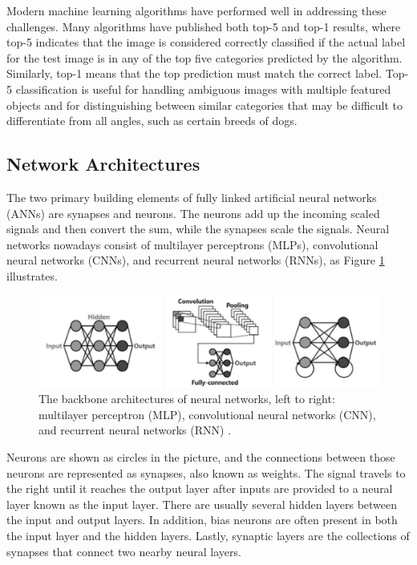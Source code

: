\noindent Modern machine learning algorithms have performed well in addressing these challenges. Many algorithms have published both top-5 and top-1 results, where top-5 indicates that the image is considered correctly classified if the actual label for the test image is in any of the top five categories predicted by the algorithm. Similarly, top-1 means that the top prediction must match the correct label. Top-5 classification is useful for handling ambiguous images with multiple featured objects and for distinguishing between similar categories that may be difficult to differentiate from all angles, such as certain breeds of dogs.

\subsection[Network Architectures]{Network Architectures}

The two primary building elements of fully linked artificial neural networks (ANNs) are synapses and neurons. The neurons add up the incoming scaled signals and then convert the sum, while the synapses scale the signals. Neural networks nowadays consist of multilayer perceptrons (MLPs), convolutional neural networks (CNNs), and recurrent neural networks (RNNs), as Figure \ref{fig:1i} illustrates.

\begin{figure}[htbp!] 
\centering    
\includegraphics[width=1\textwidth]{Chapter1/Figs/1i.png}
\caption[The backbone architectures of neural networks]{The backbone architectures of neural networks, left to right: multilayer perceptron (MLP), convolutional neural networks (CNN), and recurrent neural networks (RNN) \cite{stone2019artificial}.}
\label{fig:1i}
\end{figure}

\noindent Neurons are shown as circles in the picture, and the connections between those neurons are represented as synapses, also known as weights. The signal travels to the right until it reaches the output layer after inputs are provided to a neural layer known as the input layer. There are usually several hidden layers between the input and output layers. In addition, bias neurons are often present in both the input layer and the hidden layers. Lastly, synaptic layers are the collections of synapses that connect two nearby neural layers. \\

